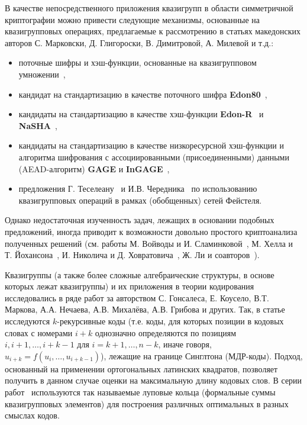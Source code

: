     В качестве непосредственного приложения квазигрупп в области симметричной криптографии можно привести следующие механизмы, основанные на квазигрупповых операциях, предлагаемые к рассмотрению в статьях македонских авторов С. Марковски, Д. Глигороски, В. Димитровой, А. Милевой и т.д.:
    \begin{itemize}
        \item поточные шифры и хэш-функции, основанные на квазигрупповом умножении~\autocite{markovski1999quasigroup, markovski2003quasigroup, markovski2017quasigroup, snavsel2009hash},
        \item кандидат на стандартизацию в качестве поточного шифра \textbf{Edon80}~\autocite{edon80},
        \item кандидаты на стандартизацию в качестве хэш-функции \textbf{Edon-R}~\autocite{EdonR, EdonRprime} и \textbf{NaSHA}~\autocite{nasha, mileva2009quasigroup},
        \item кандидаты на стандартизацию в качестве низкоресурсной хэш-функции и алгоритма шифрования с ассоциированными (присоединенными) данными (AEAD-алгоритм) \textbf{GAGE} и \textbf{InGAGE}~\autocite{otte2019gage, gligoroski2019s},
        \item предложения Г. Теселеану~\autocite{tecseleanu2021quasigroups, tecseleanu2022security, tecseleanu2023cryptographic} и И.В. Чередника~\autocite{cherednik17, cherednik19, cherednik20} по использованию квазигрупповых операций в рамках (обобщенных) сетей Фейстеля.
    \end{itemize}
    Однако недостаточная изученность задач, лежащих в основании подобных предложений, иногда приводит к возможности довольно простого криптоанализа полученных решений (см. работы М. Войводы и И. Сламинковой~\autocite{vojvoda2004cryptanalysis,vojvoda2007note,slaminkova2010cryptanalysis}, М. Хелла и Т. Йохансона~\autocite{hell2007key}, И. Николича и Д. Ховратовича~\autocite{nikolicfree}, Ж. Ли и соавторов~\autocite{li2010collision}).

    Квазигруппы (а также более сложные алгебраические структуры, в основе которых лежат квазигруппы) и их приложения в теории кодирования исследовались в ряде работ за авторством С. Гонсалеса, Е. Коусело, В.Т. Маркова, А.А. Нечаева, А.В. Михалёва, А.В. Грибова и других.
    Так, в статье \autocite{nechaev98} исследуются $k$-рекурсивные коды (т.е. коды, для которых позиции в кодовых словах с номерами $i+k$ однозначно определяются по позициям $i, i+1, \ldots, i+k-1$ для $i = k+1, \ldots, n-k$, иначе говоря, $u_{i+k} = f(u_i, \ldots, u_{i+k-1})$), лежащие на границе Синглтона (МДР-коды).
    Подход, основанный на применении ортогональных латинских квадратов, позволяет получить в данном случае оценки на максимальную длину кодовых слов.
    В серии работ~\autocite{nechaev04, couselo2004loop, markov12, markov2020nonassociative} используются так называемые луповые кольца (формальные суммы квазигрупповых элементов) для построения различных оптимальных в разных смыслах кодов.

